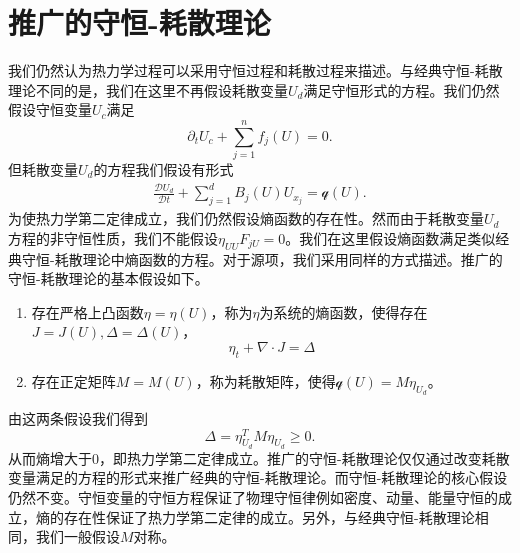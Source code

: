 
\section{推广的守恒-耗散理论}
我们仍然认为热力学过程可以采用守恒过程和耗散过程来描述。与经典守恒-耗散理论不同的是，我们在这里不再假设耗散变量$U_d$满足守恒形式的方程。我们仍然假设守恒变量$U_c$满足
\begin{equation*}
	\partial_t U_c + \sum_{j=1}^n f_j(U) = 0.
\end{equation*}
但耗散变量$U_d$的方程我们假设有形式
\begin{eqnarray*}
	\frac{\mathcal{D} U_d}{\mathcal{D} t} + \sum_{j=1}^d B_{j}(U)U_{x_j} = \mathcal{q}(U).
\end{eqnarray*}
为使热力学第二定律成立，我们仍然假设熵函数的存在性。然而由于耗散变量$U_d$方程的非守恒性质，我们不能假设$\eta_{UU}F_{jU} = 0$。我们在这里假设熵函数满足类似经典守恒-耗散理论中熵函数的方程。对于源项，我们采用同样的方式描述。推广的守恒-耗散理论的基本假设如下。
\begin{enumerate}
		\item 存在严格上凸函数$\eta = \eta (U)$，称为$\eta$为系统的熵函数，使得存在$J=J(U),\Delta = \Delta(U)$，
		\begin{equation}
			\eta_t + \nabla \cdot J = \Delta
		\end{equation}
		\item 存在正定矩阵$M = M(U)$，称为耗散矩阵，使得$\mathcal{q}(U) = M \eta_{U_d}$。
	\end{enumerate}
	由这两条假设我们得到
	\begin{equation*}
		\Delta = \eta_{U_d}^T M \eta_{U_d} \ge 0.
	\end{equation*}
从而熵增大于0，即热力学第二定律成立。推广的守恒-耗散理论仅仅通过改变耗散变量满足的方程的形式来推广经典的守恒-耗散理论。而守恒-耗散理论的核心假设仍然不变。守恒变量的守恒方程保证了物理守恒律例如密度、动量、能量守恒的成立，熵的存在性保证了热力学第二定律的成立。另外，与经典守恒-耗散理论相同，我们一般假设$M$对称。


